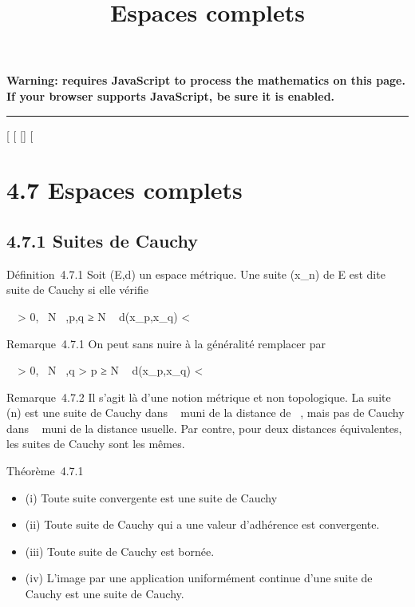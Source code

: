 \documentclass[]{article}
\title{Espaces complets}
\author{}
\date{}
\begin{document}
\maketitle

\textbf{Warning: 
requires JavaScript to process the mathematics on this page.\\ If your
browser supports JavaScript, be sure it is enabled.}

\begin{center}\rule{3in}{0.4pt}\end{center}

[
[
[]
[

\section{4.7 Espaces complets}

\subsection{4.7.1 Suites de Cauchy}

Définition~4.7.1 Soit (E,d) un espace métrique. Une suite (x_n)
de E est dite suite de Cauchy si elle vérifie

\forall~~\epsilon > 0,
\exists~N \in {}~,\quad p,q ≥ N \rigtharrow~
d(x_p,x_q) < \epsilon

Remarque~4.7.1 On peut sans nuire à la généralité remplacer par

\forall~~\epsilon > 0,
\exists~N \in {}~,\quad q > p
≥ N \rigtharrow~ d(x_p,x_q) < \epsilon

Remarque~4.7.2 Il s'agit là d'une notion métrique et non topologique. La
suite (n) est une suite de Cauchy dans ~ muni de la distance de
\overline{}~, mais pas de Cauchy dans ~ muni de la
distance usuelle. Par contre, pour deux distances équivalentes, les
suites de Cauchy sont les mêmes.

Théorème~4.7.1

\begin{itemize}
\itemsep1pt\parskip0pt
\item
  (i) Toute suite convergente est une suite de Cauchy
\item
  (ii) Toute suite de Cauchy qui a une valeur d'adhérence est
  convergente.
\item
  (iii) Toute suite de Cauchy est bornée.
\item
  (iv) L'image par une application uniformément continue d'une suite de
  Cauchy est une suite de Cauchy.
\end{itemize}
\end{document}
